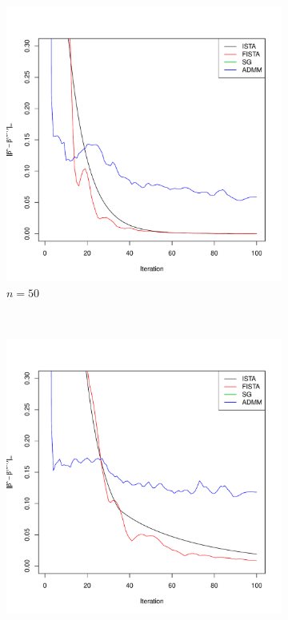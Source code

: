 \documentclass[12pt, leqno]{article}
\theoremstyle{remark}
\begin{document}
\begin{figure}[H]
\begin{subfigure}[b]{0.4\textwidth}
        \includegraphics[width=\textwidth]{50cvgc-cn.pdf}
        \caption{$n=50$}
        \label{fig:50}
    \end{subfigure}
\\
    \begin{subfigure}[b]{0.4\textwidth}
        \includegraphics[width=\textwidth]{100cvgc-cn.pdf}

\end{subfigure}
\end{figure}
\end{document}
